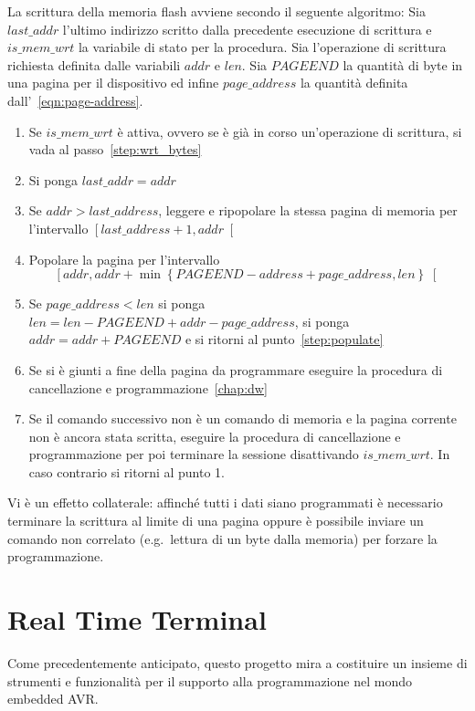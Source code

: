 La scrittura della memoria flash avviene secondo il seguente algoritmo:
Sia \(last\_addr\) l'ultimo indirizzo scritto dalla precedente esecuzione di scrittura e \(is\_mem\_wrt\) la variabile di stato per la procedura.
Sia l'operazione di scrittura richiesta definita dalle variabili \(addr\) e \(len\). Sia \(PAGEEND\) la quantità di byte in una pagina per il dispositivo ed infine \(page\_address\) la quantità definita dall'~\cref{eqn:page-address}.

\begin{enumerate}
    \item Se \(is\_mem\_wrt\) è attiva, ovvero se è già in corso un'operazione di scrittura, si vada al passo~\ref{step:wrt_bytes}
    \item Si ponga \(last\_addr = addr\)
    \item\label{step:wrt_bytes} Se \(addr > last\_address\), leggere e ripopolare la stessa pagina di memoria per l'intervallo \(\left[last\_address + 1, addr\right[\)
    \item\label{step:populate} Popolare la pagina per l'intervallo \[\left[addr, addr + \min\left\{PAGEEND - address + page\_address, len\right\}\right[ \]
    \item Se \(page\_address < len\) si ponga \(len = len - PAGEEND + addr - page\_address\), si ponga \(addr = addr + PAGEEND\) e si ritorni al punto~\ref{step:populate}
    \item Se si è giunti a fine della pagina da programmare eseguire la procedura di cancellazione e programmazione~\ref{chap:dw}
    \item Se il comando successivo non è un comando di memoria e la pagina corrente non è ancora stata scritta, eseguire la procedura di cancellazione e programmazione per poi terminare la sessione disattivando \(is\_mem\_wrt\). In caso contrario si ritorni al punto 1.
\end{enumerate}

Vi è un effetto collaterale: affinché tutti i dati siano programmati è necessario terminare la scrittura al limite di una pagina oppure è possibile inviare un comando non correlato (e.g.\ lettura di un byte dalla memoria) per forzare la programmazione.

\section{Real Time Terminal}\label{s:rtt}

Come precedentemente anticipato, questo progetto mira a costituire un insieme di strumenti e funzionalità per il supporto alla programmazione nel mondo embedded AVR.\@

